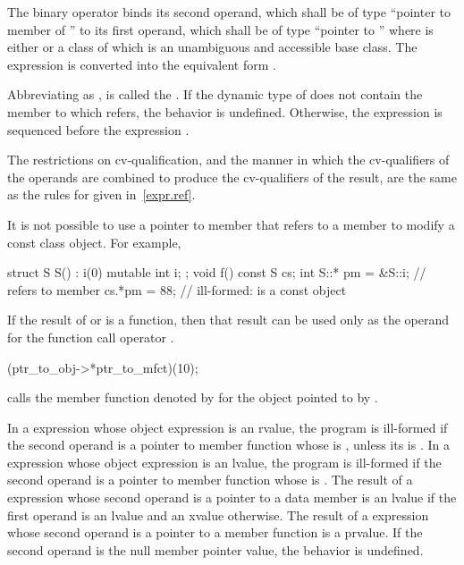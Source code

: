 \pnum
The binary operator \tcode{->*} binds its second operand, which shall be
of type ``pointer to member of '' to its first operand, which shall be of
type ``pointer to ''
where  is either  or
a class of which 
is an unambiguous and accessible base class.
The expression  is converted into the equivalent form
.

\pnum
Abbreviating  as , 
is called the .
If the dynamic type of  does not
contain the member to which
 refers, the behavior is undefined.
Otherwise, the expression  is sequenced before the expression .

\pnum
The restrictions on cv-qualification, and the manner in which
the cv-qualifiers of the operands are combined to produce the
cv-qualifiers of the result, are the same as the rules for
 given in~\ref{expr.ref}.
\begin{note}
It is not possible to use a pointer to member that refers to a
 member to modify a const class object. For
example,
\begin{codeblock}
struct S {
  S() : i(0) { }
  mutable int i;
};
void f()
{
const S cs;
int S::* pm = &S::i;            //  refers to  member 
cs.*pm = 88;                    // ill-formed:  is a const object
}
\end{codeblock}
\end{note}

\pnum
{}%
If the result of  or \tcode{->*} is a function, then that
result can be used only as the operand for the function call operator
\tcode{()}.
\begin{example}
\begin{codeblock}
(ptr_to_obj->*ptr_to_mfct)(10);
\end{codeblock}
calls the member function denoted by  for the object
pointed to by .
\end{example}
In a  expression whose object expression is an rvalue, the program is
ill-formed if the second operand is a pointer to member function
whose  is \tcode{\&},
unless its  is .
In a 
expression whose object expression is an lvalue, the program is ill-formed if the second
operand is
a pointer to member function
whose  is \tcode{\&\&}.
The result of a  expression
whose second operand is a pointer to a data member is an lvalue if the first
operand is an lvalue and an xvalue otherwise. The result of a  expression whose
second operand is a pointer to a member function is a prvalue.
If the second operand is the null
member pointer value, the behavior is undefined.

